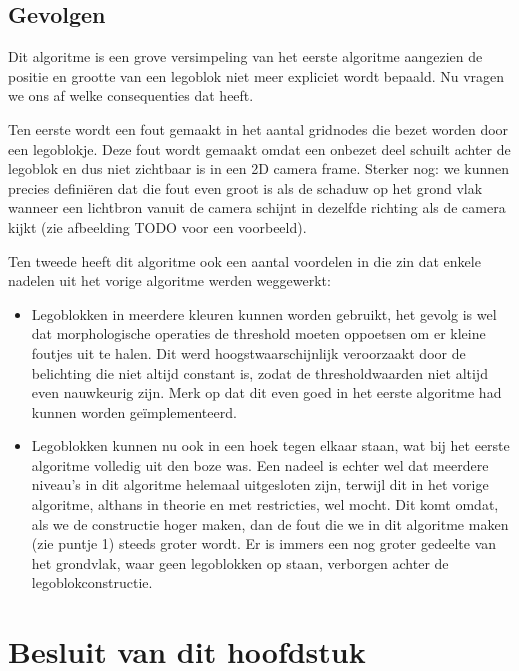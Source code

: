 \subsection{Gevolgen}
Dit algoritme is een grove versimpeling van het eerste algoritme aangezien de positie en grootte van een legoblok niet meer expliciet wordt bepaald. Nu vragen we ons af welke consequenties dat heeft.

Ten eerste wordt een fout gemaakt in het aantal gridnodes die bezet worden door een legoblokje. Deze fout wordt gemaakt omdat een onbezet deel schuilt achter de legoblok en dus niet zichtbaar is in een 2D camera frame. Sterker nog: we kunnen precies defini\"eren dat die fout even groot is als de schaduw op het grond vlak wanneer een lichtbron vanuit de camera schijnt in dezelfde richting als de camera kijkt (zie afbeelding TODO voor een voorbeeld).

Ten tweede heeft dit algoritme ook een aantal voordelen in die zin dat enkele nadelen uit het vorige algoritme werden weggewerkt:
\begin{itemize}
\item Legoblokken in meerdere kleuren kunnen worden gebruikt, het gevolg is wel dat morphologische operaties de threshold moeten oppoetsen om er kleine foutjes uit te halen. Dit werd hoogstwaarschijnlijk veroorzaakt door de belichting die niet altijd constant is, zodat de thresholdwaarden niet altijd even nauwkeurig zijn. Merk op dat dit even goed in het eerste algoritme had kunnen worden ge\"implementeerd.
\item Legoblokken kunnen nu ook in een hoek tegen elkaar staan, wat bij het eerste algoritme volledig uit den boze was. Een nadeel is echter wel dat meerdere niveau's in dit algoritme helemaal uitgesloten zijn, terwijl dit in het vorige algoritme, althans in theorie en met restricties, wel mocht. Dit komt omdat, als we de constructie hoger maken, dan de fout die we in dit algoritme maken (zie puntje 1) steeds groter wordt. Er is immers een nog groter gedeelte van het grondvlak, waar geen legoblokken op staan, verborgen achter de legoblokconstructie.
\end{itemize}

\section{}

\section{Besluit van dit hoofdstuk}
